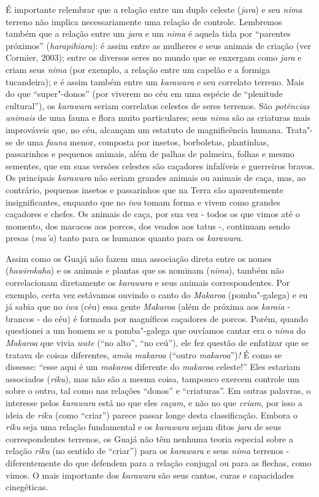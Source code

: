 É importante relembrar que a relação entre um duplo celeste
(\emph{jara}) e seu \emph{nima} terreno não implica necessariamente uma
relação de controle. Lembremos também que a relação entre um \emph{jara}
e um \emph{nima} é aquela tida por ``parentes próximos''
(\emph{harapihiara}): é assim entre as mulheres e seus animais de
criação (ver Cormier, 2003); entre os diversos seres no mundo que se
enxergam como \emph{jara} e criam seus \emph{nima} (por exemplo, a
relação entre um capelão e a formiga tucandeira); e é assim também entre
um \emph{karawara} e seu correlato terreno. Mais do que ``super"-donos''
(por viverem no céu em uma espécie de ``plenitude cultural''), os
\emph{karawara} seriam correlatos celestes de seres terrenos. São
\emph{potências animais} de uma fauna e flora muito particulares; seus
\emph{nima} são as criaturas mais improváveis que, no céu, alcançam um
estatuto de magnificência humana. Trata"-se de uma \emph{fauna} menor,
composta por insetos, borboletas, plantinhas, passarinhos e pequenos
animais, além de palhas de palmeira, folhas e mesmo sementes, que em
suas versões celestes são caçadores infalíveis e guerreiros bravos. Os
principais \emph{karawara} não seriam grandes animais ou animais de
caça, mas, ao contrário, pequenos insetos e passarinhos que na Terra são
aparentemente insignificantes, enquanto que no \emph{iwa} tomam forma e
vivem como grandes caçadores e chefes. Os animais de caça, por sua vez -
todos os que vimos até o momento, dos macacos aos porcos, dos veados aos
tatus -, continuam sendo presas (\emph{ma'a}) tanto para os humanos
quanto para os \emph{karawara}.

Assim como os Guajá não fazem uma associação direta entre os nomes
(\emph{hawirokaha}) e os animais e plantas que os nominam (\emph{nima}),
também não correlacionam diretamente os \emph{karawara} e seus animais
correspondentes. Por exemplo, certa vez estávamos ouvindo o canto do
\emph{Makaroa} (pomba"-galega) e eu já sabia que no \emph{iwa} (céu) essa
gente \emph{Makaroa} (além de próxima aos \emph{karaia} - brancos - do
céu) é formada por magníficos caçadores de porcos. Porém, quando
questionei a um homem se a pomba"-galega que ouvíamos cantar era o
\emph{nima} do \emph{Makaroa} que vivia \emph{wate} (``no alto'', ``no
ceú''), ele fez questão de enfatizar que se tratava de coisas diferentes,
\emph{amõa} \emph{makaroa} (``outro \emph{makaroa}'')\emph{!} É como se
dissesse: ``esse aqui é um \emph{makaroa} diferente do \emph{makaroa}
celeste!'' Eles estariam associados (\emph{riku}), mas não são a mesma
coisa, tampouco exercem controle um sobre o outro, tal como nas relações
``donos'' e ``criaturas''. Em outras palavras, o interesse pelos
\emph{karawara} está no que eles \emph{caçam}, e não no que
\emph{criam}, por isso a ideia de \emph{riku} (como ``criar'') parece
passar longe desta classificação. Embora o \emph{riku} seja uma relação
fundamental e os \emph{karawara} sejam ditos \emph{jara} de seus
correspondentes terrenos, os Guajá não têm nenhuma teoria especial sobre
a relação \emph{riku} (no sentido de ``criar'') para os \emph{karawara} e
seus \emph{nima} terrenos - diferentemente do que defendem para a
relação conjugal ou para as flechas, como vimos. O mais importante dos
\emph{karawara} são seus cantos, curas e capacidades cinegéticas.

